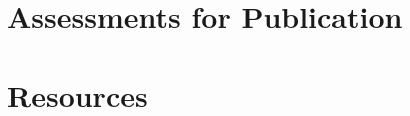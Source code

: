 \documentclass{book}
\begin{document}
\appendix

\chapter{Assessments for Publication}
  \clearpage %
  \clearpage  %

\chapter{Resources}
  

 \clearpage%

\newif\ifbooknotes

\booknotesfalse

\ifbooknotes
\chapter{Book notes}
\clearpage
\clearpage
\clearpage
\clearpage
\clearpage
\clearpage
\clearpage
\clearpage


\else

\fi

\clearpage

\printglossaries

\nocite{*} %






\printindex
\end{document}
